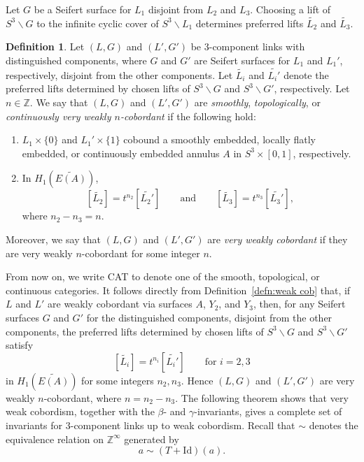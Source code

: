 \documentclass[a4paper, 11pt]{amsart}
\theoremstyle{definition}
\newtheorem{definition}[theorem]{Definition}
\newcommand{\Z}{\mathbb{Z}}
\begin{document}
Let $G$ be a Seifert surface for $L_1$ disjoint from $L_2$ and $L_3$. Choosing a lift of
$S^3\smallsetminus G$ to the infinite cyclic cover of $S^3\smallsetminus L_1$ determines preferred
lifts $\widetilde{L_2}$ and $\widetilde{L_3}$.

\begin{definition}\label{defn: very weak cobordism}
Let $(L,G)$ and $(L',G')$ be $3$-component links with distinguished components, where $G$ and $G'$ are Seifert surfaces for $L_1$ and $L_1'$, respectively, disjoint from the other components. Let $\widetilde{L_i}$ and $\widetilde{L_i'}$ denote the preferred lifts determined by chosen lifts of $S^3\smallsetminus G$ and $S^3\smallsetminus G'$, respectively. Let $n\in \Z$.  We say that $(L,G)$ and $(L',G')$ are \emph{smoothly}, \emph{topologically}, or \emph{continuously very weakly $n$-cobordant} if the following hold:
\begin{enumerate}
\item \label{item: very weak cob - concordance}
$L_1\times\{0\}$ and $L_1'\times\{1\}$ cobound a smoothly embedded, locally flatly embedded, or continuously embedded annulus $A$ in $S^3\times[0,1]$, respectively.

\item \label{item: very weak cob - homology}
In $H_1(\widetilde{E(A)})$,
\[
[\widetilde{L_2}]=t^{n_2}[\widetilde{L_2'}]
\qquad\text{and}\qquad
[\widetilde{L_3}]=t^{n_3}[\widetilde{L_3'}],
\]
where $n_2-n_3=n$.
\end{enumerate}
Moreover, we say that $(L,G)$ and $(L',G')$ are \emph{very weakly cobordant} if they are very weakly $n$-cobordant for some integer $n$.
\end{definition}

From now on, we write \textsc{CAT} to denote one of the smooth, topological, or continuous categories. It follows directly from Definition~\ref{defn:weak cob}  that, if $L$ and $L'$ are weakly cobordant via surfaces $A$, $Y_2$, and $Y_3$, then, for any Seifert surfaces $G$ and $G'$ for the distinguished components, disjoint from the other components, the preferred lifts determined by chosen lifts of $S^3\smallsetminus G$ and $S^3\smallsetminus G'$ satisfy
\[
[\widetilde{L_i}]=t^{n_i}[\widetilde{L_i'}]
\qquad\text{for } i=2,3
\]
in $H_1(\widetilde{E(A)})$ for some integers $n_2,n_3$. Hence $(L,G)$ and $(L',G')$ are very weakly $n$-cobordant, where $n=n_2-n_3$. The following theorem shows that very weak cobordism, together with the $\beta$- and $\gamma$-invariants, gives a complete set of invariants for $3$-component links up to weak cobordism. Recall that $\sim$ denotes the equivalence relation on $\Z^\infty$ generated by
\[
a\sim (T+\mathrm{Id})(a).
\]
\end{document}
